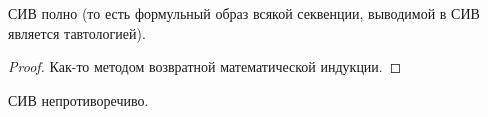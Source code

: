 \documentclass[main]{subfiles}
\begin{document}
\begin{theorem}
    СИВ полно (то есть формульный образ всякой секвенции, выводимой в СИВ является тавтологией).
\end{theorem}
\begin{proof}
    Как-то методом возвратной математической индукции.
\end{proof}
\begin{theorem}
    СИВ непротиворечиво.
\end{theorem}
\end{document}
